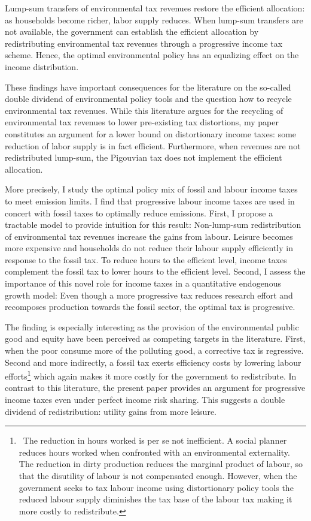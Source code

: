 Lump-sum transfers of environmental tax revenues restore the efficient allocation: as households become richer, labor supply reduces. When lump-sum transfers are not available, the government can establish the efficient allocation by redistributing environmental tax revenues through a progressive income tax scheme.
Hence, the optimal environmental policy has an equalizing effect on the income distribution.

These findings have important consequences for the literature on the so-called double dividend of environmental policy tools and the question how to recycle environmental tax revenues. While this literature argues for the recycling of environmental tax revenues to lower pre-existing tax distortions, my paper constitutes an argument for a lower bound on distortionary income taxes: some reduction of labor supply is in fact efficient. 
Furthermore, when revenues are not redistributed lump-sum, the Pigouvian tax does not implement the efficient allocation. 

More precisely, I study the optimal policy mix of fossil and labour income taxes to meet emission limits. 
I find that progressive labour income taxes are used in concert with fossil taxes to optimally reduce emissions. 
 First, I propose a tractable model to provide intuition for this result: Non-lump-sum redistribution of environmental tax revenues increase the gains from labour. Leisure becomes more expensive and households do not reduce their labour supply efficiently in response to the fossil tax. To reduce hours to the efficient level, income taxes complement the fossil tax to lower hours to the efficient level.  
Second, I assess the importance of this novel role for income taxes in a quantitative endogenous growth model:
Even though a more progressive tax reduces research effort  and recomposes production towards the fossil sector, the optimal tax is progressive. 

The finding is especially interesting as the provision of the environmental public good and equity have been perceived as competing targets in the literature. First, when the poor consume more of the polluting good, a corrective tax is regressive. Second and more indirectly, a fossil tax exerts efficiency costs by lowering labour efforts\footnote{\ The reduction in hours worked is per se not inefficient. A social planner reduces hours worked when confronted with an environmental externality. The reduction in dirty production reduces the marginal product of labour, so that the disutility of labour is not compensated enough. However, when the government seeks to tax labour income using distortionary policy tools the reduced labour supply diminishes the tax base of the labour tax making it more costly to redistribute.} which again makes it more costly for the government to redistribute. 
In contrast to this literature, the present paper provides an argument for progressive income taxes even under perfect income risk sharing. This suggests a double dividend of redistribution: utility gains from more leisure.


